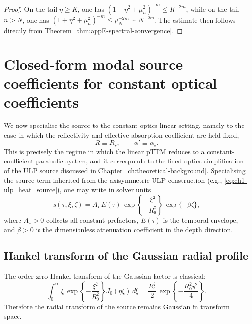\begin{proof}
    On the tail \(\eta\ge K\), one has
    \((1+\eta^2+\mu_n^2)^{-m}\le K^{-2m}\), while on the tail \(n>N\), one has
    \((1+\eta^2+\mu_n^2)^{-m}\le \mu_N^{-2m}\sim N^{-2m}\).
    The estimate then follows directly from
    Theorem~\ref{thm:appE-spectral-convergence}.
\end{proof}

\section{Closed-form modal source coefficients for constant optical coefficients}
\label{sec:appE-special-source-cases}

We now specialise the source to the constant-optics linear setting, namely to
the case in which the reflectivity and effective absorption coefficient are
held fixed,
\[
    R\equiv R_\star,
    \qquad
    \alpha' \equiv \alpha_\star.
\]
This is precisely the regime in which the linear pTTM reduces to a
constant-coefficient parabolic system, and it corresponds to the fixed-optics
simplification of the ULP source discussed in
Chapter~\ref{ch:theoretical-background}.
Specialising the source term inherited from the axisymmetric ULP construction (e.g., \eqref{eq:ch1-ulp_heat_source}),
one may write in solver units
\begin{equation}
    s(\tau,\xi,\zeta)
    =
    A_\star\, E(\tau)\,
    \exp\!\left\{-\frac{\xi^2}{R_0^2}\right\}\,
    \exp\{-\beta \zeta\},
    \label{eq:appE-separable-source}
\end{equation}
where \(A_\star>0\) collects all constant prefactors,
\(E(\tau)\) is the temporal envelope, and
\(\beta>0\) is the dimensionless attenuation coefficient in the depth
direction.

\subsection{Hankel transform of the Gaussian radial profile}
\label{sec:appE-gaussian-radial-transform}

The order-zero Hankel transform of the Gaussian factor is classical:
\begin{equation}
    \int_0^\infty
    \xi\,
    \exp\!\left\{-\frac{\xi^2}{R_0^2}\right\}
    J_0(\eta\xi)\, d\xi
    =
    \frac{R_0^2}{2}\,
    \exp\!\left\{-\frac{R_0^2\eta^2}{4}\right\}.
    \label{eq:appE-gaussian-hankel}
\end{equation}
Therefore the radial transform of the source remains Gaussian in transform
space.

